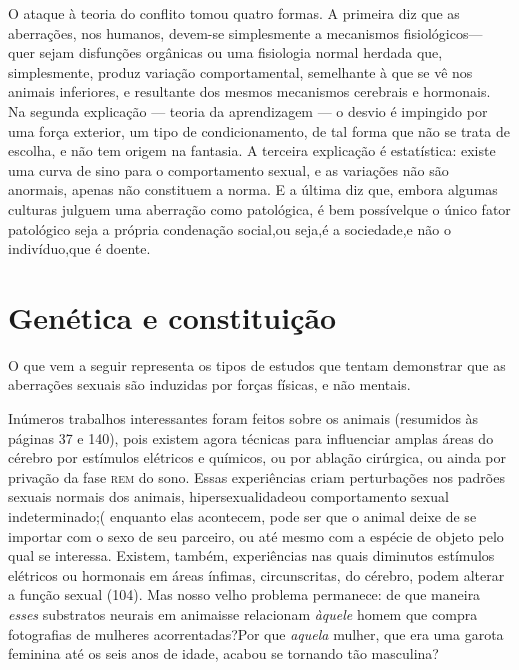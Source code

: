  O ataque à teoria do conflito tomou quatro formas. A primeira diz que
as aberrações, nos humanos, devem-se simplesmente a mecanismos
fisiológicos\idxaberrfisic[|(] --- quer sejam disfunções orgânicas ou uma fisiologia normal
herdada que, simplesmente, produz variação comportamental, semelhante à
que se vê nos animais inferiores, e resultante dos mesmos mecanismos
cerebrais e hormonais. Na segunda explicação --- teoria da aprendizagem\idxsocia{} ---
o desvio é impingido por uma força exterior, um tipo de
condicionamento, de tal forma que não se trata de escolha, e não tem
origem na fantasia. A terceira explicação é\idxestat{} estatística:\idxaberrestat{} existe uma
curva de sino para o comportamento sexual, e as variações não são
anormais, apenas não constituem a norma. E a última diz que, embora
algumas culturas\idxrela{} julguem uma aberração como patológica, é bem possível\idxsexopteor[|)]
que o único fator patológico seja a própria condenação social,\idxconf[|)] ou seja,\idxsexuateo[|)]
é a sociedade,\idxfreudsexua[|)] e não o indivíduo,\idxfreud[|)] que é doente.

\section{Genética e constituição}

 O que vem\idxgenet{} a seguir representa os tipos de estudos que tentam demonstrar
que as aberrações sexuais são induzidas por forças físicas, e não
mentais.

 Inúmeros trabalhos interessantes foram feitos sobre os animais
(resumidos às páginas 37 e 140), pois existem agora técnicas para
influenciar amplas áreas do cérebro por estímulos elétricos e químicos,
ou por ablação cirúrgica, ou ainda por privação da fase \textsc{rem} do sono.
Essas experiências criam perturbações nos padrões sexuais normais dos
animais,\idxhiper{} hipersexualidade\idxcerebhipe[|(] ou comportamento sexual indeterminado;(
enquanto elas acontecem, pode ser que o animal deixe de se importar com
o sexo de seu parceiro, ou até mesmo com a espécie de objeto pelo qual
se interessa. Existem, também, experiências nas quais diminutos
estímulos elétricos ou hormonais em áreas ínfimas, circunscritas, do
cérebro, podem alterar a função sexual (104). Mas nosso velho problema
permanece: de que maneira \textit{esses} substratos neurais em animais\idxaberranim[|)]
se relacionam \textit{àquele} homem que compra fotografias de mulheres
acorrentadas?\idxanim[|)] Por que \textit{aquela} mulher, que era uma garota
feminina até os seis anos de idade, acabou se tornando tão masculina?

